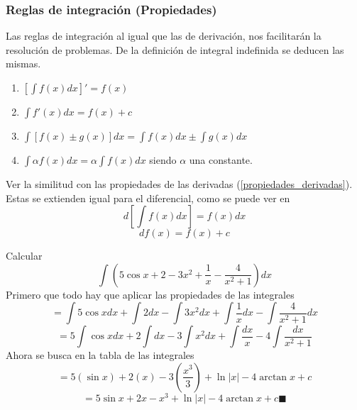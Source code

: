 \documentclass[10pt,twoside]{SelfArx} %
\begin{document}
\subsubsection{Reglas de integración (Propiedades)}   
Las reglas de integración al igual que las de derivación, nos facilitarán la resolución de problemas. De la definición de integral indefinida se deducen las mismas.
\begin{enumerate}\label{Reglas_integracion}
	\item $ \displaystyle\left [ \int f(x)dx\right ]'=f(x) $
	\item $ \displaystyle\int f'(x)dx=f(x)+c $
	\item $ \displaystyle\int \left [f(x)\pm g(x)\right]dx=\int f(x)dx\pm\int g(x)dx $
	\item $ \displaystyle\int\alpha f(x)dx=\alpha\int f(x)dx $ siendo $ \alpha $ una constante.
\end{enumerate}
Ver la similitud con las propiedades de las derivadas (\ref{propiedades_derivadas}).
 Estas se extienden igual para el diferencial, como se puede ver en 
 \begin{equation}
 \displaystyle d\left [\int f(x)dx\right ]=f(x)dx
 \end{equation}
 \begin{equation}
 \displaystyle df(x)=f(x)+c
 \end{equation}
\begin{ejemplo}
	Calcular
	\[  \displaystyle\int\left (5\cos x+2-3x^{2}+\dfrac{1}{x}-\dfrac{4}{x^{2}+1}\right )dx \]
	Primero que todo hay que aplicar las propiedades de las integrales
	\begin{equation}
	=\displaystyle\int5\cos xdx+\int2dx-\int3x^{2}dx+\int\dfrac{1}{x}dx-\int\dfrac{4}{x^{2}+1}dx
	\end{equation}
	\begin{equation}
	=\displaystyle5\int\cos xdx+2\int dx-3\int x^{2}dx+\int\dfrac{dx}{x}-4\int\dfrac{dx}{x^{2}+1}
	\end{equation}
	Ahora se busca en la tabla de las integrales
\begin{equation}
	=\displaystyle5(\sin x)+2(x)-3\left (\dfrac{x^{3}}{3}\right )+\ln |x|-4\arctan x+ c
\end{equation}
\begin{equation}
=\displaystyle5\sin x+2x-x^{3}+\ln |x|-4\arctan x+ c\blacksquare
\end{equation}
\end{ejemplo} 
\end{document}
